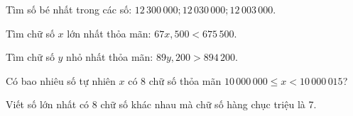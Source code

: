 \begin{ex} %
Tìm số bé nhất trong các số: $12\,300\,000; 12\,030\,000; 12\,003\,000$.
\end{ex}

\begin{ex} %
Tìm chữ số $x$ lớn nhất thỏa mãn: $67x,500 < 675\,500$.
\end{ex}

\begin{ex} %
Tìm chữ số $y$ nhỏ nhất thỏa mãn: $89y,200 > 894\,200$.
\end{ex}

\begin{ex} %
Có bao nhiêu số tự nhiên $x$ có 8 chữ số thỏa mãn $10\,000\,000 \le x < 10\,000\,015$?
\end{ex}

\begin{ex} %
Viết số lớn nhất có 8 chữ số khác nhau mà chữ số hàng chục triệu là 7.
\end{ex}
